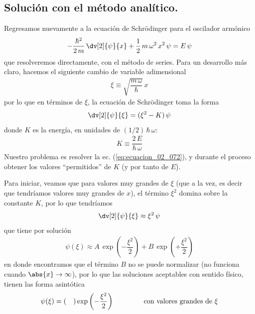 \subsection{Solución con el método analítico.}
Regresamos nuevamente a la ecuación de Schrödinger para el oscilador armónico
\begin{align}
- \dfrac{\hbar^{2}}{2 \, m} \, \dv[2]{\psi}{x} + \dfrac{1}{2} \, m \, \omega^{2} \, x^{2} \, \psi = E \, \psi
\label{eq:ecuacion_02_070}
\end{align}
que resolveremos directamente, con el método de series. Para un desarrollo más claro, hacemos el siguiente cambio de variable adimensional
\begin{align}
\xi \equiv \sqrt{ \dfrac{m \, \omega}{\hbar}} \, x
\label{eq:ecuacion_02_071}
\end{align}
por lo que en términos de $\xi$, la ecuación de Schrödinger toma la forma
\begin{align}
\dv[2]{\psi}{\xi} = (\xi^{2} - K) \, \psi
\label{eq:ecuacion_02_072}
\end{align}
donde $K$ es la energía, en unidades de $(1/2) \, \hbar \, \omega$:
\begin{align}
K \equiv \dfrac{2 \, E}{\hbar \, \omega}
\label{eq:ecuacion_02_073}
\end{align}
Nuestro problema es resolver la ec. (\ref{eq:ecuacion_02_072}), y durante el proceso obtener los valores \enquote{permitidos} de $K$ (y por tanto de $E$).
\par
Para iniciar, veamos que para valores muy grandes de $\xi$ (que a la vez, es decir que tendríamos valores muy grandes de $x$), el término $\xi^{2}$ domina sobre la constante $K$, por lo que tendríamos
\begin{align}
\dv[2]{\psi}{\xi} \approx \xi^{2} \, \psi
\label{eq:ecuacion_02_074}
\end{align}
que tiene por solución
\begin{align}
\psi (\xi) \approx A \, \exp \left( - \dfrac{\xi^{2}}{2} \right) + B \, \exp \left( + \dfrac{\xi^{2}}{2} \right)
\label{eq:ecuacion_02_075}
\end{align}
en donde encontramos que el término $B$ no se puede normalizar (no funciona cuando $\abs{x} \to \infty$), por lo que las soluciones aceptables con sentido físico, tienen las forma asintótica
\begin{align}
\psi (\xi) = ( \quad ) \exp \left( - \dfrac{\xi^{2}}{2} \right) \hspace{1.5cm} \text{con valores grandes de } \xi
\label{eq:ecuacion_02_076}
\end{align}
